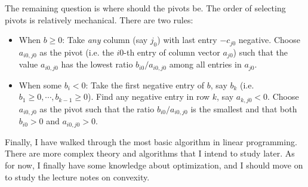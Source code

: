 \documentclass[12pt]{article}
\begin{document}
The remaining question is where should the pivots be. The order of selecting pivots is relatively mechanical. There are two rules: 
\begin{itemize}
\item When $b\geq 0$: Take \emph{any} column (say $j_0$) with last entry $-c_{j0}$ negative. Choose $a_{i0,j0}$ as the pivot (i.e. the $i0$-th entry of column vector $a_{j0}$) such that the value $a_{i0,j0}$ has the lowest ratio $b_{i0}/a_{i0,j0}$ among all entries in $a_{j0}$.
\item When some $b_i< 0$: Take the first negative entry of $b$, say $b_k$ (i.e. $b_1\geq 0,\cdots,b_{k-1}\geq0$). Find any negative entry in row $k$, say $a_{k,j0}<0$. Choose $a_{i0,j0}$ as the pivot such that the ratio $b_{i0}/a_{i0,j0}$ is the smallest and that both $b_{i0}>0$ and $a_{i0,j0}>0$.
\end{itemize}

Finally, I have walked through the most basic algorithm in linear programming. There are more complex theory and algorithms that I intend to study later. As for now, I finally have some knowledge about optimization, and I should move on to study the lecture notes on convexity.



\end{document}
